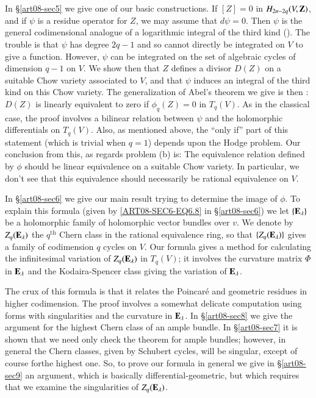 In \S\ref{art08-sec5} we give one of our basic constructions. If $[Z]=0$ in $H_{2n-2q}\break (V,\bfZ)$, and if $\psi$ is a residue operator for $Z$, we may assume that $d\psi=0$. Then $\psi$ is the general codimensional analogue of a logarithmic integral of the third kind (\cite{art08-key17}). The trouble is that $\psi$ has degree $2q-1$ and so cannot directly be integrated on $V$ to give a function. However, $\psi$ can be integrated on the set of algebraic cycles of dimension $q-1$ on $V$. We show then that $Z$ defines a divisor $D(Z)$ on a suitable Chow variety associated to $V$, and that $\psi$ induces an integral of the third kind on this Chow variety. The generalization of Abel's theorem we give is then : $D(Z)$ is linearly equivalent to zero if $\phi_{q}(Z)=0$ in $T_{q}(V)$. As in the classical case, the proof involves a bilinear relation between $\psi$ and the holomorphic differentials on $T_{q}(V)$. Also, as mentioned above, the ``only if'' part of this statement (which is trivial when $q=1$) depends upon the Hodge problem. Our conclusion from this, as regards problem (b) is: The equivalence relation defined by $\phi$ should be linear equivalence on a suitable Chow variety. In particular, we don't see that this equivalence should necessarily be rational equivalence on $V$.

In \S\ref{art08-sec6} we give our main result trying to determine the image of $\phi$. To explain this formula (given by \eqref{ART08-SEC6-EQ6.8} in \S\ref{art08-sec6}) we let $\{\mathbf{E}_{\lambda}\}$ be a holomorphic family of holomorphic vector bundles over $v$. We denote by $Z_{q}(\mathbf{E}_{\lambda})$ the $q^{\text{th}}$ Chern class in the rational equivalence ring, so that $\{Z_{q}(\mathbf{E}_{\lambda})\}$ gives a family of codimension $q$ cycles on $V$. Our formula gives a method for calculating the infinitesimal variation of $Z_{q}(\mathbf{E}_{\lambda})$ in $T_{q}(V)$; it involves the curvature matrix $\Phi$ in $\mathbf{E}_{\lambda}$ and the Kodaira-Spencer class giving the variation of $\mathbf{E}_{\lambda}$.

The crux of this formula is that it relates the Poincar\'e and geometric residues in higher codimension. The proof involves a somewhat delicate computation using forms with singularities and the curvature in $\mathbf{E}_{\lambda}$. In \S\ref{art08-sec8} we give the argument for the highest Chern class of an ample bundle. In \S\ref{art08-sec7} it is shown that we need only check the theorem for ample bundles; however, in general the Chern classes, given by Schubert cycles, will be singular, except of course for\pageoriginale the highest one. So, to prove our formula in general we give in \S\ref{art08-sec9} an argument, which is basically differential-geometric, but which requires that we examine the singularities of $Z_{q}(\mathbf{E}_{\lambda})$.

